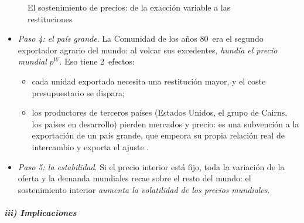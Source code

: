 \documentclass[11pt]{article}
\begin{document}
\begin{figure}[H]
\centering
\caption{El sostenimiento de precios: de la exacción variable a las restituciones}\label{fig:sostenimiento}
\end{figure}

\begin{itemize}
\item \emph{Paso 4: el país grande}. La Comunidad de los años 80~era el segundo exportador agrario del mundo: al volcar sus excedentes, \emph{hundía el precio mundial} $p^W$. Eso tiene 2~efectos:
  \begin{itemize}
  \item cada unidad exportada necesita una restitución mayor, y el coste presupuestario se dispara;
  \item los productores de terceros países (Estados Unidos, el grupo de Cairns, los países en desarrollo) pierden mercados y precio: es una subvención a la exportación de un país grande, que empeora su propia relación real de intercambio y exporta el ajuste .
  \end{itemize}
\item \emph{Paso 5: la estabilidad}. Si el precio interior está fijo, toda la variación de la oferta y la demanda mundiales recae sobre el resto del mundo: el sostenimiento interior \emph{aumenta la volatilidad de los precios mundiales}.
\end{itemize}

\subparagraph{iii) Implicaciones}
\end{document}
